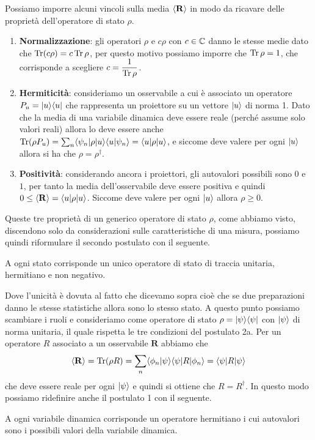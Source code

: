Possiamo imporre alcuni vincoli sulla media $ \left< \mathbf{R} \right> $ in modo da ricavare delle proprietà dell'operatore di stato $ \rho $. 
\begin{enumerate}
  \item \textbf{Normalizzazione}: gli operatori $ \rho $ e $ c \rho $ con $ c \in \mathbb{C} $ danno le stesse medie dato che $ \operatorname{\textnormal{Tr}} (c\rho) = c \operatorname{\textnormal{Tr}} \rho $, per 
  questo motivo possiamo imporre che $ \operatorname{\textnormal{Tr}} \rho = 1 $, che corrisponde a scegliere $ \displaystyle c = \frac1{\operatorname{\textnormal{Tr}}\rho} $.
  \item \textbf{Hermiticità}: consideriamo un osservabile a cui è associato un operatore $ P_u = \vert u \rangle \langle u \vert $ che rappresenta un proiettore 
  su un vettore $ \vert u \rangle $ di norma 1. Dato che la media di una variabile dinamica deve essere reale (perché assume solo valori 
  reali) allora lo deve essere anche $ \operatorname{\textnormal{Tr}} (\rho P_u) = \sum_n \langle \psi_n \vert \rho \vert u \rangle \langle u|\psi_n \rangle = \langle u \vert \rho \vert u \rangle $, e siccome deve valere per ogni 
  $ \vert u \rangle $ allora si ha che $ \rho = \rho^\dagger $. %
  \item \textbf{Positività}: considerando ancora i proiettori, gli autovalori possibili sono $ 0 $ e $ 1 $, per tanto la media dell'osservabile 
  deve essere positiva e quindi $ 0 \leq \left< \mathbf{R} \right> = \langle u \vert \rho \vert u \rangle $. Siccome deve valere per ogni $ \vert u \rangle $ allora $ \rho \geq 0 $.
\end{enumerate}
Queste tre proprietà di un generico operatore di stato $ \rho $, come abbiamo visto, discendono solo da considerazioni sulle caratteristiche di una misura, 
possiamo quindi riformulare il secondo postulato con il seguente.
\begin{postulate}[ 2a ]
  A ogni stato corrisponde un unico operatore di stato di traccia unitaria, hermitiano e non negativo.
\end{postulate}
Dove l'unicità è dovuta al fatto che dicevamo sopra cioè che se due preparazioni danno le stesse statistiche allora sono lo stesso stato. A questo punto 
possiamo scambiare i ruoli e consideriamo come operatore di stato $ \rho = \vert \psi \rangle \langle \psi \vert $ con $ \vert \psi \rangle $ di norma unitaria, 
il quale rispetta le tre condizioni del postulato 2a. Per un operatore $ R $ associato a un osservabile $ \mathbf{R} $ abbiamo che 
\begin{align*}
  \sca{\mathbf{R}} = \Tr(\rho R) = \sum_{n} \bk{\phi_n|\psi} \b{\psi} R \k{\phi_n} = \b{\psi} R \k{\psi}
\end{align*}
che deve essere reale per ogni $ \vert \psi \rangle $ e quindi si ottiene che $ R = R^\dagger $. In questo modo possiamo ridefinire anche il postulato 1 con il 
seguente.
\begin{postulate}[ 1a ]
  A ogni variabile dinamica corrisponde un operatore hermitiano i cui autovalori sono i possibili valori della variabile dinamica.
\end{postulate}

